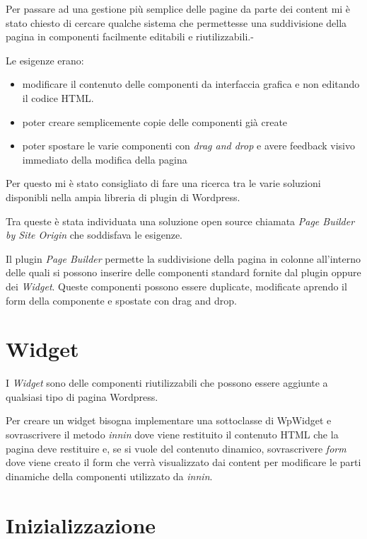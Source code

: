 


Per passare ad una gestione più semplice delle pagine da parte dei content
mi è stato chiesto di cercare qualche sistema che permettesse una suddivisione
della pagina in componenti facilmente editabili e riutilizzabili.-

Le esigenze erano:
\begin{itemize}
\item modificare il contenuto delle componenti da interfaccia grafica e non 
editando il codice HTML.
\item poter creare semplicemente copie delle componenti già create
\item poter spostare le varie componenti con \emph{drag and drop} e avere
feedback visivo immediato della modifica della pagina
\end{itemize}

Per questo mi è stato consigliato di fare una ricerca tra le varie soluzioni disponibli
nella ampia libreria di plugin di Wordpress.

Tra queste è stata individuata una soluzione open source chiamata \emph{Page Builder by
Site Origin} che soddisfava le esigenze.

Il plugin \emph{Page Builder} permette la suddivisione della pagina in colonne all'interno delle quali
si possono inserire delle componenti standard fornite dal plugin oppure dei \emph{Widget}.
Queste componenti possono essere duplicate, modificate aprendo il form della componente e spostate
con drag and drop.
\section{Widget}
I \emph{Widget} sono delle componenti riutilizzabili che possono essere aggiunte a qualsiasi
tipo di pagina Wordpress. 

Per creare un widget bisogna implementare una sottoclasse di WpWidget\cite{WPWID}
e sovrascrivere il metodo \emph{innin} dove viene restituito il contenuto HTML che la pagina deve restituire
e, se si vuole del contenuto dinamico, sovrascrivere \emph{form} dove viene creato il form che verrà visualizzato dai content per modificare le
parti dinamiche della componenti utilizzato da \emph{innin}.

\section{Inizializzazione}
